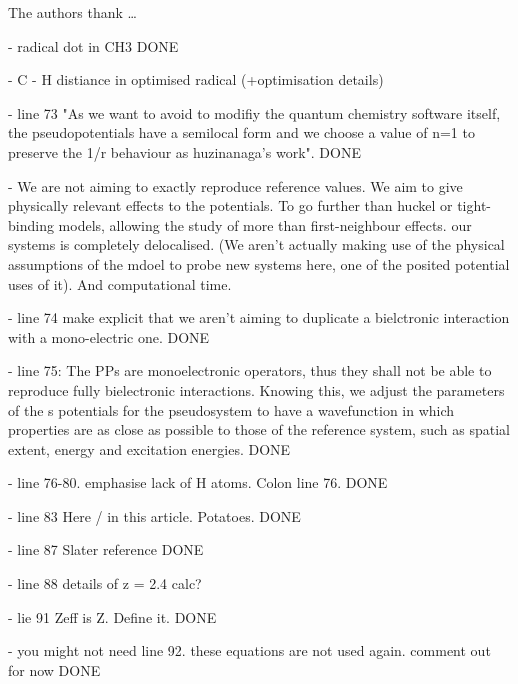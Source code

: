 \documentclass[journal=jctcce,manuscript=article]{achemso}
\begin{document}
\begin{acknowledgement}

The authors thank \ldots

\end{acknowledgement}

- radical dot in CH3 DONE

- C - H distiance in optimised radical (+optimisation details)

- line 73 "As we want to avoid to modifiy the quantum chemistry software itself, the pseudopotentials have a semilocal form and we choose a value of n=1 to preserve the 1/r behaviour as huzinanaga's work". DONE

- We are not aiming to exactly reproduce reference values. We aim to give physically relevant effects to the potentials. To go further than huckel or tight-binding models, allowing the study of more than first-neighbour effects. our systems is completely delocalised. (We aren't actually making use of the physical assumptions of the mdoel to probe new systems here, one of the posited potential uses of it). And computational time.

- line 74 make explicit that we aren't aiming to duplicate a bielctronic interaction with a mono-electric one. DONE

- line 75: The PPs are monoelectronic operators, thus they shall not be able to reproduce fully bielectronic interactions. Knowing this, we adjust the parameters of the s potentials for the pseudosystem to have a wavefunction in which properties are as close as possible to those of the reference system, such as spatial extent, energy and excitation energies. DONE

- line 76-80. emphasise lack of H atoms. Colon line 76. DONE

- line 83 Here / in this article. Potatoes. DONE

- line 87 Slater reference DONE

- line 88 details of z = 2.4 calc?

- lie 91 Zeff is Z. Define it. DONE

- you might not need line 92. these equations are not used again. comment out for now DONE
\end{document}

